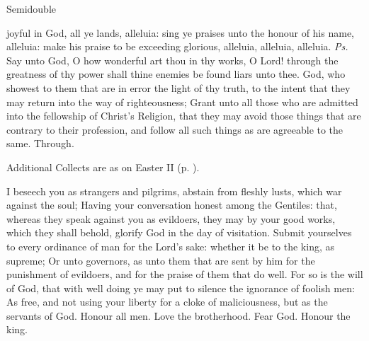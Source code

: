 \begin{inhead}
    {Semidouble}
\end{inhead}
\par\noindent
{}

\introit
{} joyful in God, all ye lands, alleluia: sing ye praises unto the honour of his name, alleluia: make his praise to be exceeding glorious, alleluia, alleluia, alleluia. \textit{Ps.} Say unto God, O how wonderful art thou in thy works, O Lord! through the greatness of thy power shall thine enemies be found liars unto thee.
\collect
{} God, who showest to them that are in error the light of thy truth, to the intent that they may return into the way of righteousness; Grant unto all those who are admitted into the fellowship of Christ's Religion, that they may avoid those things that are contrary to their profession, and follow all such things as are agreeable to the same. Through.
\begin{rubric}
    Additional Collects are as on Easter II (p. \pageref{EasterII}).
\end{rubric}
 I beseech you as strangers and pilgrims, abstain from fleshly lusts, which war against the soul; Having your conversation honest among the Gentiles: that, whereas they speak against you as evildoers, they may by your good works, which they shall behold, glorify God in the day of visitation. Submit yourselves to every ordinance of man for the Lord's sake: whether it be to the king, as supreme; Or unto governors, as unto them that are sent by him for the punishment of evildoers, and for the praise of them that do well. For so is the will of God, that with well doing ye may put to silence the ignorance of foolish men: As free, and not using your liberty for a cloke of maliciousness, but as the servants of God. Honour all men. Love the brotherhood. Fear God. Honour the king.
